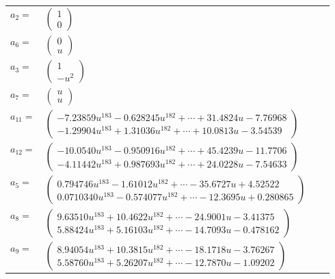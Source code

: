 \documentclass[1p]{elsarticle_modified}
\theoremstyle{definition}
\begin{document}
\begin{tabular}{m{7pt} m{180pt} m{7pt} m{180pt} }
\flushright $a_{2}=$&$\begin{pmatrix}1\\0\end{pmatrix}$ \\
\flushright $a_{6}=$&$\begin{pmatrix}0\\u\end{pmatrix}$ \\
\flushright $a_{3}=$&$\begin{pmatrix}1\\- u^2\end{pmatrix}$ \\
\flushright $a_{7}=$&$\begin{pmatrix}u\\u\end{pmatrix}$ \\
\flushright $a_{11}=$&$\begin{pmatrix}-7.23859 u^{183}-0.628245 u^{182}+\cdots+31.4824 u-7.76968\\-1.29904 u^{183}+1.31036 u^{182}+\cdots+10.0813 u-3.54539\end{pmatrix}$ \\
\flushright $a_{12}=$&$\begin{pmatrix}-10.0540 u^{183}-0.950916 u^{182}+\cdots+45.4239 u-11.7706\\-4.11442 u^{183}+0.987693 u^{182}+\cdots+24.0228 u-7.54633\end{pmatrix}$ \\
\flushright $a_{5}=$&$\begin{pmatrix}0.794746 u^{183}-1.61012 u^{182}+\cdots-35.6727 u+4.52522\\0.0710340 u^{183}-0.574077 u^{182}+\cdots-12.3695 u+0.280865\end{pmatrix}$ \\
\flushright $a_{8}=$&$\begin{pmatrix}9.63510 u^{183}+10.4622 u^{182}+\cdots-24.9001 u-3.41375\\5.88424 u^{183}+5.16103 u^{182}+\cdots-14.7093 u-0.478162\end{pmatrix}$ \\
\flushright $a_{9}=$&$\begin{pmatrix}8.94054 u^{183}+10.3815 u^{182}+\cdots-18.1718 u-3.76267\\5.58760 u^{183}+5.26207 u^{182}+\cdots-12.7870 u-1.09202\end{pmatrix}$ \\

\end{tabular}
\end{document}
